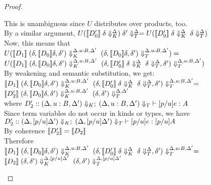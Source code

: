 \begin{proof}
\begin{enumerate}
\begin{itemize}
\begin{tabbedproof}
      \oooo This is unambiguous since $U$ distributes over products, too. \\
      \oooo By a similar argument, $U(\interp{D'_0}\;\restricttyenv{\Delta}{\delta})\;\restrictvals{\Delta}{\delta'} = U(\interp{D'_0}\;\restricttyenv{\Delta}{\delta}\;\restrictvals{\Delta}{\delta})$ \\
      \oooo Now, this means that \\
      \oooox $U(\interp{D_1}\;\restricttyenv{\Delta,u:B,\Delta'}{(\delta, \interp{D_0}\delta,\delta')}\;\restrictvals{\Delta,u:B,\Delta'}{(\delta,\interp{D_0}\delta,\delta')}) =$ \\
      \oooox $U(\interp{D_1}\;\restricttyenv{\Delta,u:B,\Delta'}{(\delta, \interp{D_0}\delta,\delta')}\;\restrictvals{\Delta,u:B,\Delta'}{(\delta, \interp{D'_0}\;\restricttyenv{\Delta}{\delta}\;\restrictvals{\Delta}{\delta},\delta')})$ \\
      \oooo By weakening and semantic substitution, we get: \\
      \oooox $\interp{D_1}\;\restricttyenv{\Delta,u:B,\Delta'}{(\delta, \interp{D_0}\delta,\delta')}\;\restrictvals{\Delta,u:B,\Delta'}{(\delta, \interp{D'_0}\;\restricttyenv{\Delta}{\delta}\;\restrictvals{\Delta}{\delta},\delta')} =$ \\
      \oooox $\interp{D'_2}\;\restricttyenv{\Delta,u:B,\Delta'}{(\delta,\interp{D_0}\delta,\delta')}\;
                             \restrictvals{\Delta,\Delta'}{(\delta,\delta')}$ \\
      \oooo where $D'_2 :: \judgeE[\restrictkind{\Delta,u:B,\Delta'}]
                                  {\restricttype{\Delta,u:B,\Delta'}}{[p/u]e}{A}$ \\
      \oooo Since term variables do not occur in kinds or types, we have \\
      \oooox $D'_2 :: \judgeE[\restrictkind{\Delta,[p/u]\Delta'}]
                                  {\restricttype{\Delta,[p/u]\Delta'}}{[p/u]e}{[p/u]A}$ \\
      \oooo By coherence $\interp{D'_2} = \interp{D_2}$ \\
      \oooo Therefore \\
      \oooox $\interp{D_1}\;\restricttyenv{\Delta,u:B,\Delta'}{(\delta, \interp{D_0}\delta,\delta')}\;\restrictvals{\Delta,u:B,\Delta'}{(\delta, \interp{D'_0}\;\restricttyenv{\Delta}{\delta}\;\restrictvals{\Delta}{\delta},\delta')} =$ \\
      \oooox $\interp{D_2}\;\restricttyenv{\Delta,[p/u]\Delta'}{(\delta,\delta')}\;
                             \restrictvals{\Delta,[p/u]\Delta'}{(\delta,\delta')}$ \\

\end{tabbedproof}
\end{itemize}
\end{enumerate}
\end{proof}
